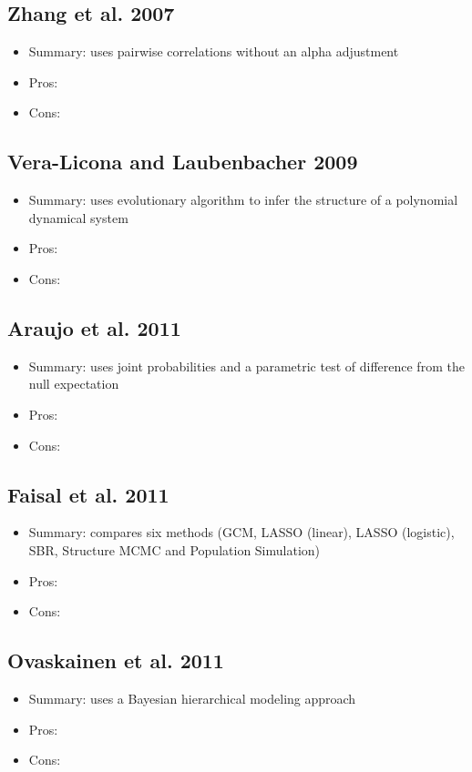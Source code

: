 \documentclass[12pt]{article}
\begin{document}
\subsection{Zhang et al. 2007}
\begin{itemize}
\item Summary: uses pairwise correlations without an alpha adjustment
\item Pros:
\item Cons:
\end{itemize}
\subsection{Vera-Licona and Laubenbacher 2009}
\begin{itemize}
\item Summary: uses evolutionary algorithm to infer the structure of a
  polynomial dynamical system
\item Pros:
\item Cons:
\end{itemize}
\subsection{Araujo et al. 2011}
\begin{itemize}
\item Summary: uses joint probabilities and a parametric test of
  difference from the null expectation
\item Pros:
\item Cons:
\end{itemize}
\subsection{Faisal et al. 2011}
\begin{itemize}
\item Summary: compares six methods (GCM, LASSO (linear), LASSO
  (logistic), SBR, Structure MCMC and Population Simulation)
\item Pros:
\item Cons:
\end{itemize}
\subsection{Ovaskainen et al. 2011}
\begin{itemize}
\item Summary: uses a Bayesian hierarchical modeling approach
\item Pros:
\item Cons:
\end{itemize}
\end{document}
